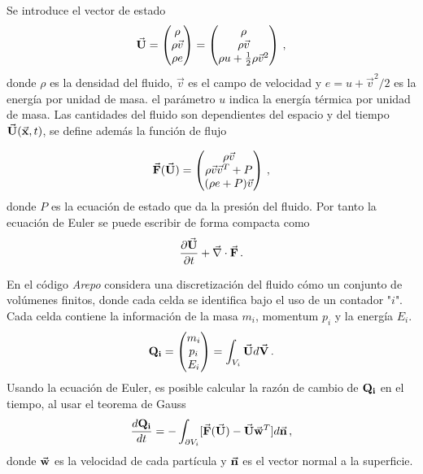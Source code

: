 Se introduce el vector de estado    
\begin{align}
    \vec{\bf{U}}= \begin{pmatrix} \rho \\ \rho\vec{v} \\ \rho e \end{pmatrix} = 
    \begin{pmatrix} \rho \\ \rho\vec{v} \\ \rho u+\frac{1}{2}\rho\vec{v}^{2} \end{pmatrix}\,,
\end{align}
donde $\rho$ es la densidad del fluido, $\vec{v}$ es el campo de velocidad y $e=u+ \vec{v}^{2}/2$ es la energía por unidad de masa. el parámetro $u$ indica la energía térmica por unidad de masa. Las cantidades del fluido son dependientes del espacio y del tiempo $\vec{\bf{U}}(\vec{\bf{x}},t)$, se define además la función de flujo

\begin{align}
    \vec{\bf{F}}(\vec{\bf{U}})=
    \begin{pmatrix} \rho\vec{v} \\ \rho\vec{v}\vec{v}^{T}+ P \\ (\rho e + P)\vec{v} \end{pmatrix}\,,
\end{align}
donde $P$ es la ecuación de estado que da la presión del fluido. Por tanto  la ecuación de Euler se puede escribir de forma compacta como 
\begin{align}
    \frac{\partial\vec{\bf{U}}}{\partial t} + \vec{\nabla}\cdot \vec{\bf{F}}\,.
\end{align}

En el código {\it{Arepo}}  considera una discretización del fluido cómo un conjunto de volúmenes finitos, donde cada celda se identifica bajo el uso de un contador "$i$". Cada celda contiene la información de la masa $m_{i}$, momentum $p_{i}$ y la energía $E_{i}$. %
\begin{align}
    {\bf{Q}_{i}} = \begin{pmatrix} m_{i} \\ p_{i} \\ E_{i} \end{pmatrix} = \int_{V_{i}} \vec{\bf{U}}d\vec{\bf{V}}\,.
\end{align}
%
Usando la ecuación de Euler, es posible calcular la razón de cambio de ${\bf{Q}_{i}}$ en el tiempo, al usar el teorema de Gauss
\begin{align}
    \frac{d{\bf{Q_{i}}}}{dt} = -\int_{\partial V_{i}}[\vec{\bf{F}}(\vec{\bf{U}})-\vec{\bf{U}}\vec{\bf{w}}^{T}]d\vec{\bf{n}}\,,
\end{align}
donde $\vec{\bf{w}}$ es la velocidad de cada partícula y $\vec{\bf{n}}$ es el vector normal a la superficie.

